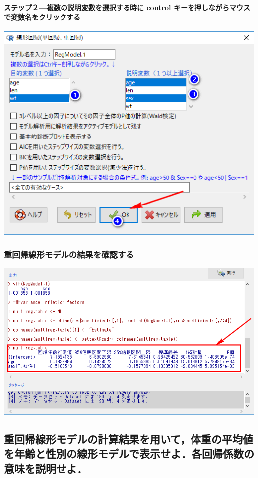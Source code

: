 \documentclass[11pt,]{problemset}
\let\oldparagraph\paragraph
\renewcommand{\paragraph}[1]{\oldparagraph{#1}\mbox{}}
\begin{document}
\newpage
\vfill

\hypertarget{-control-}{%
\paragraph{ステップ２---複数の説明変数を選択する時に control
キーを押しながらマウスで変数名をクリックする}\label{-control-}}

\begin{center}\includegraphics[width=0.6\linewidth]{pic/lm04} \end{center}

\subsubsection{重回帰線形モデルの結果を確認する}

\begin{center}\includegraphics[width=0.8\linewidth]{pic/lm05} \end{center}

\subsection{重回帰線形モデルの計算結果を用いて，体重の平均値を年齢と性別の線形モデルで表示せよ．各回帰係数の意味を説明せよ．}
\end{document}
